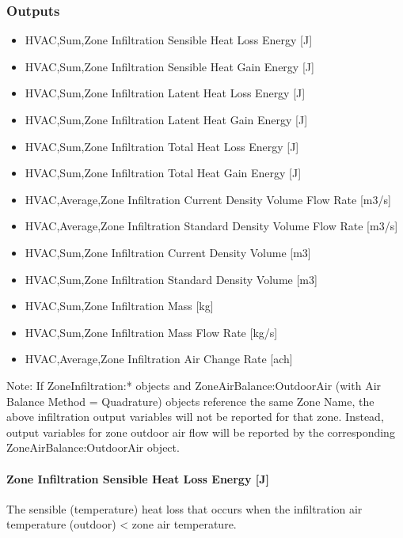 \subsubsection{Outputs}\label{outputs-003}

\begin{itemize}
\item
  HVAC,Sum,Zone Infiltration Sensible Heat Loss Energy {[}J{]}
\item
  HVAC,Sum,Zone Infiltration Sensible Heat Gain Energy {[}J{]}
\item
  HVAC,Sum,Zone Infiltration Latent Heat Loss Energy {[}J{]}
\item
  HVAC,Sum,Zone Infiltration Latent Heat Gain Energy {[}J{]}
\item
  HVAC,Sum,Zone Infiltration Total Heat Loss Energy {[}J{]}
\item
  HVAC,Sum,Zone Infiltration Total Heat Gain Energy {[}J{]}
\item
  HVAC,Average,Zone Infiltration Current Density Volume Flow Rate {[}m3/s{]}
\item
  HVAC,Average,Zone Infiltration Standard Density Volume Flow Rate {[}m3/s{]}
\item
  HVAC,Sum,Zone Infiltration Current Density Volume {[}m3{]}
\item
  HVAC,Sum,Zone Infiltration Standard Density Volume {[}m3{]}
\item
  HVAC,Sum,Zone Infiltration Mass {[}kg{]}
\item
  HVAC,Sum,Zone Infiltration Mass Flow Rate {[}kg/s{]}
\item
  HVAC,Average,Zone Infiltration Air Change Rate {[}ach{]}
\end{itemize}

Note: If ZoneInfiltration:* objects and ZoneAirBalance:OutdoorAir (with Air Balance Method = Quadrature) objects reference the same Zone Name, the above infiltration output variables will not be reported for that zone. Instead, output variables for zone outdoor air flow will be reported by the corresponding ZoneAirBalance:OutdoorAir object.

\paragraph{Zone Infiltration Sensible Heat Loss Energy {[}J{]}}\label{zone-infiltration-sensible-heat-loss-energy-j}

The sensible (temperature) heat loss that occurs when the infiltration air temperature (outdoor) \textless{} zone air temperature.

